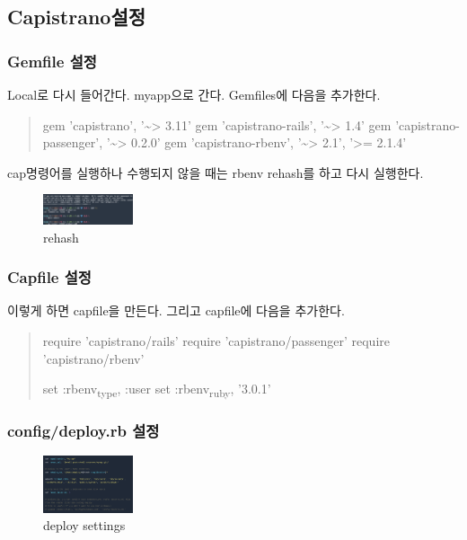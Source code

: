 \documentclass[11pt]{article}
\begin{document}
\subsection{Capistrano설정}
\label{sec:orgbd97903}
\subsubsection*{Gemfile 설정}
\label{sec:org5cc1cfd}
Local로 다시 들어간다. myapp으로 간다. Gemfiles에 다음을 추가한다.
\begin{quote}
gem 'capistrano', '\textasciitilde{}> 3.11'
gem 'capistrano-rails', '\textasciitilde{}> 1.4'
gem 'capistrano-passenger', '\textasciitilde{}> 0.2.0'
gem 'capistrano-rbenv', '\textasciitilde{}> 2.1', '>= 2.1.4'
\end{quote}
cap명령어를 실행하나 수행되지 않을 때는 rbenv rehash를 하고 다시 실행한다.
\begin{figure}[htbp]
\centering
\includegraphics[width=100px]{./img/rehash.png}
\caption{\label{fig:org10b4fcc}rehash}
\end{figure}
\subsubsection*{Capfile 설정}
\label{sec:orgfef2ed3}
이렇게 하면 capfile을 만든다. 그리고 capfile에 다음을 추가한다.
\begin{quote}
require 'capistrano/rails'
require 'capistrano/passenger'
require 'capistrano/rbenv'

set :rbenv\textsubscript{type}, :user
set :rbenv\textsubscript{ruby}, '3.0.1'
\end{quote}
\subsubsection*{config/deploy.rb 설정}
\label{sec:org17f3df7}
\begin{figure}[htbp]
\centering
\includegraphics[width=100px]{./img/deploysettings.png}
\caption{\label{fig:org22c106c}deploy settings}
\end{figure}
\end{document}
